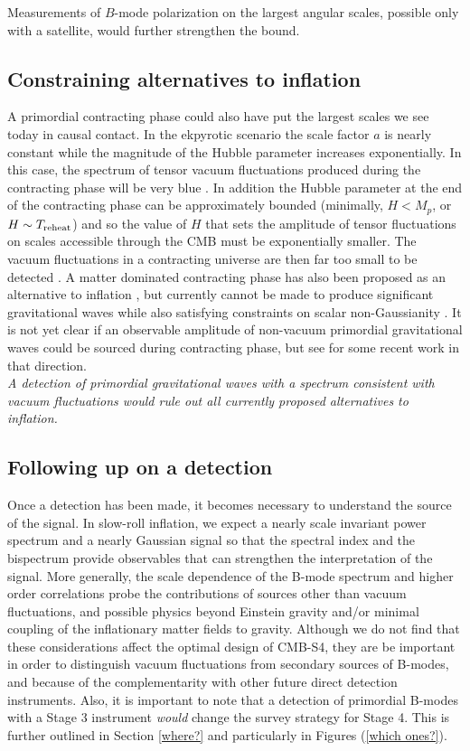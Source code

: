 Measurements of $B$-mode polarization on the largest angular scales, possible only with a satellite, would further strengthen the bound. 

\subsection{Constraining alternatives to inflation}
A primordial contracting phase could also have put the largest scales we see today in causal contact. In the ekpyrotic scenario the scale factor $a$ is nearly constant while the magnitude of the Hubble parameter increases exponentially. In this case, the spectrum of tensor vacuum fluctuations produced during the contracting phase will be very blue \cite{Khoury:2001wf}. In addition the Hubble parameter at the end of the contracting phase can be approximately bounded (minimally, $H<M_p$, or $H\sim T_{\rm reheat}$) and so the value of $H$ that sets the amplitude of tensor fluctuations on scales accessible through the CMB must be exponentially smaller. The vacuum fluctuations in a contracting universe are then far too small to be detected \cite{Boyle:2003km}. A matter dominated contracting phase has also been proposed as an alternative to inflation \cite{Brandenberger:2012zb,Cai:2014jla,deHaro:2015wda}, but currently cannot be made to produce significant gravitational waves while also satisfying constraints on scalar non-Gaussianity \cite{Quintin:2015rta}. It is not yet clear if an observable amplitude of non-vacuum primordial gravitational waves could be sourced during contracting phase, but see \cite{Ben-Dayan:2016iks} for some recent work in that direction. \\

{\it A detection of primordial gravitational waves with a spectrum consistent with vacuum fluctuations would rule out all currently proposed alternatives to inflation.}

\subsection{Following up on a detection}
\label{sec:beyond_r}

Once a detection has been made, it becomes necessary to understand the source of the signal. In slow-roll inflation, we expect a nearly scale invariant power spectrum and a nearly Gaussian signal so that the spectral index and the bispectrum provide observables that can strengthen the interpretation of the signal. More generally, the scale dependence of the B-mode spectrum and higher order correlations probe the contributions of sources other than vacuum fluctuations, and possible physics beyond Einstein gravity and/or minimal coupling of the inflationary matter fields to gravity. Although we do not find that these considerations affect the optimal design of CMB-S4, they are be important in order to distinguish vacuum fluctuations from secondary sources of B-modes, and because of the complementarity with other future direct detection instruments. Also, it is important to note that a detection of primordial B-modes with a Stage 3 instrument {\it would} change the survey strategy for Stage 4. This is further outlined in Section \ref{where?} and particularly in Figures (\ref{which ones?}).

